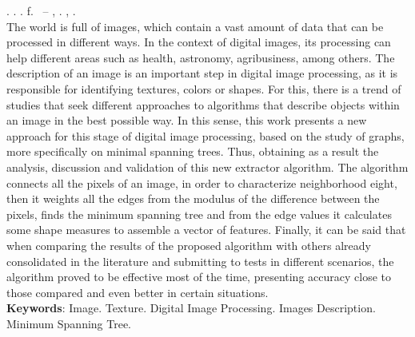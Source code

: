 
\begin{resumo}[ABSTRACT]
\begin{SingleSpacing}

\imprimirautorcitacao. \imprimirtitleabstract. \imprimirdata. \pageref {LastPage} f. \imprimirprojeto\ – \imprimirprograma, \imprimirinstituicao. \imprimirlocal, \imprimirdata.\\

The world is full of images, which contain a vast amount of data that can be processed in different ways. In the context of digital images, its processing can help different areas such as health, astronomy, agribusiness, among others. The description of an image is an important step in digital image processing, as it is responsible for identifying textures, colors or shapes. For this, there is a trend of studies that seek different approaches to algorithms that describe objects within an image in the best possible way. In this sense, this work presents a new approach for this stage of digital image processing, based on the study of graphs, more specifically on minimal spanning trees. Thus, obtaining as a result the analysis, discussion and validation of this new extractor algorithm. The algorithm connects all the pixels of an image, in order to characterize neighborhood eight, then it weights all the edges from the modulus of the difference between the pixels, finds the minimum spanning tree and from the edge values ​​it calculates some shape measures to assemble a vector of features. Finally, it can be said that when comparing the results of the proposed algorithm with others already consolidated in the literature and submitting to tests in different scenarios, the algorithm proved to be effective most of the time, presenting accuracy close to those compared and even better in certain situations.
\\

\textbf{Keywords}: Image. Texture. Digital Image Processing. Images Description. Minimum Spanning Tree.

\end{SingleSpacing}
\end{resumo}

